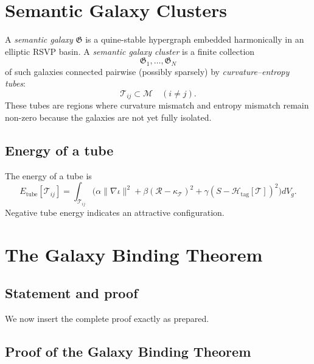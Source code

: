 \section{Semantic Galaxy Clusters}
\label{sec:galaxy-clusters}

A \emph{semantic galaxy} $\mathfrak{G}$ is a quine-stable hypergraph embedded harmonically in an elliptic RSVP basin.  
A \emph{semantic galaxy cluster} is a finite collection
\[
\mathfrak{G}_1,\dots,\mathfrak{G}_N
\]
of such galaxies connected pairwise (possibly sparsely) by \emph{curvature--entropy tubes}:
\[
\mathcal{T}_{ij} \subset \mathcal{M}
\quad (i\ne j).
\]
These tubes are regions where curvature mismatch and entropy mismatch remain non-zero because the galaxies are not yet fully isolated.

\subsection{Energy of a tube}

The energy of a tube is
\begin{equation}
E_{\mathrm{tube}}[\mathcal{T}_{ij}]
  = \int_{\mathcal{T}_{ij}}
    \bigl(
      \alpha\lVert\nabla\iota\rVert^2
      +\beta(\mathcal{R}-\kappa_{\mathcal{T}})^2
      +\gamma(S-\mathcal{H}_{\mathrm{tag}}[\mathcal{T}])^2
    \bigr)dV_g.
\end{equation}
Negative tube energy indicates an attractive configuration.

\section{The Galaxy Binding Theorem}
\label{sec:galaxy-binding}

\subsection*{Statement and proof}

We now insert the complete proof exactly as prepared.


\subsection{Proof of the Galaxy Binding Theorem}
\label{subsec:galaxy-binding-proof}

